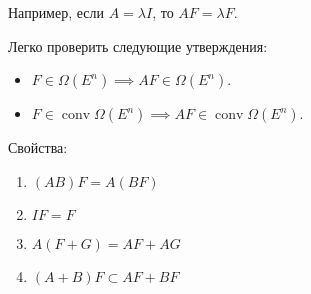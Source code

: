 Например, если $A = \lambda I$, то $AF = \lambda F$.

Легко проверить следующие утверждения:
\begin{itemize}
    \item $F \in \Omega(E^n) \implies A F \in \Omega(E^n)$.
    \item $F \in \operatorname{conv} \Omega(E^n) \implies A F \in \operatorname{conv} \Omega(E^n)$.
\end{itemize}

Свойства:
\begin{enumerate}
    \item $(A B) F = A(BF)$
    \item $I F = F$
    \item $A (F + G) = AF + AG$
    \item $(A + B)F \subset AF + BF$
\end{enumerate}

